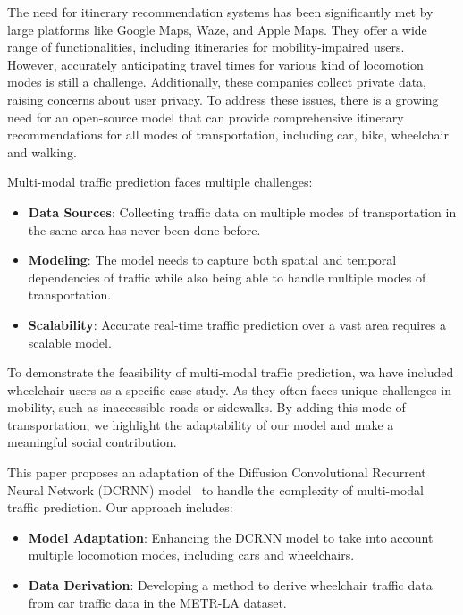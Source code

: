 The need for itinerary recommendation systems has been significantly met by large platforms like Google Maps, Waze, and Apple Maps.
They offer a wide range of functionalities, including itineraries for mobility-impaired users.
However, accurately anticipating travel times for various kind of locomotion modes is still a challenge.
Additionally, these companies collect private data, raising concerns about user privacy.
To address these issues, there is a growing need for an open-source model that can provide comprehensive itinerary
    recommendations for all modes of transportation, including car, bike, wheelchair and walking.

Multi-modal traffic prediction faces multiple challenges:
\begin{itemize}
    \item \textbf{Data Sources}:
    Collecting traffic data on multiple modes of transportation in the same area has never been done before.
    \item \textbf{Modeling}:
    The model needs to capture both spatial and temporal dependencies of traffic while also being able to handle multiple modes of transportation.
    \item \textbf{Scalability}:
    Accurate real-time traffic prediction over a vast area requires a scalable model.
\end{itemize}

To demonstrate the feasibility of multi-modal traffic prediction, wa have included wheelchair users as a specific case study.
As they often faces unique challenges in mobility, such as inaccessible roads or sidewalks.
By adding this mode of transportation, we highlight the adaptability of our model and make a meaningful social contribution.

This paper proposes an adaptation of the Diffusion Convolutional Recurrent Neural Network (DCRNN) model~\cite{DCRNN} to handle the complexity of multi-modal traffic prediction.
Our approach includes:
\begin{itemize}
    \item \textbf{Model Adaptation}:
    Enhancing the DCRNN model to take into account multiple locomotion modes, including cars and wheelchairs.
    \item \textbf{Data Derivation}:
    Developing a method to derive wheelchair traffic data from car traffic data in the METR-LA dataset.
\end{itemize}

